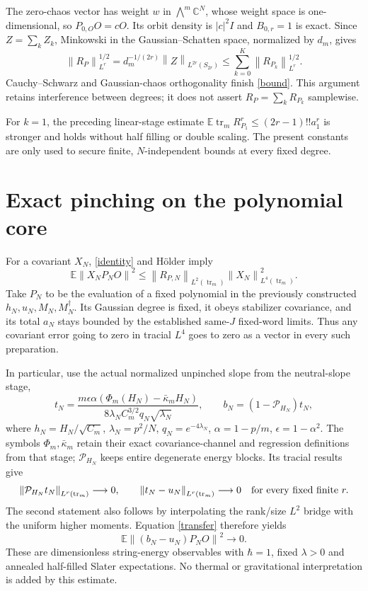 \documentclass[11pt]{article}
\newcommand{\E}{\mathbb E}
\newcommand{\tr}{\operatorname{tr}}
\newcommand{\norm}[1]{\left\lVert#1\right\rVert}
\begin{document}
The zero-chaos vector has weight $w$ in $\bigwedge^m\mathbb C^N$,
whose weight space is one-dimensional, so $P_{0,O}O=cO$. Its orbit
density is $|c|^2I$ and $B_{0,r}=1$ is exact. Since $Z=\sum_kZ_k$,
Minkowski in the Gaussian--Schatten space, normalized by $d_m$, gives
\begin{equation}
 \norm{R_P}_{L^r}^{1/2}
 =d_m^{-1/(2r)}\norm{Z}_{L^{2r}(S_{2r})}
 \le\sum_{k=0}^K\norm{R_{P_k}}_{L^r}^{1/2}.
\end{equation}
Cauchy--Schwarz and Gaussian-chaos orthogonality finish
\eqref{bound}. This argument retains interference between degrees;
it does not assert $R_P=\sum_k R_{P_k}$ samplewise.

For $k=1$, the preceding linear-stage estimate
$\E\tr_m R_{P_1}^r\le(2r-1)!!a_1^r$ is stronger and holds without
half filling or double scaling. The present constants are only used
to secure finite, $N$-independent bounds at every fixed degree.

\newpage
\section{Exact pinching on the polynomial core}
For a covariant $X_N$, \eqref{identity} and H\"older imply
\begin{equation}\label{transfer}
 \E\norm{X_NP_NO}^2
 \le\norm{R_{P,N}}_{L^2(\tr_m)}\norm{X_N}_{L^4(\tr_m)}^2.
\end{equation}
Take $P_N$ to be the evaluation of a fixed polynomial in the previously
constructed $h_N,u_N,M_N,M_N^\dagger$. Its Gaussian
degree is fixed, it obeys stabilizer covariance, and its total
$a_N$ stays bounded by the established same-$J$ fixed-word limits.
Thus any covariant error going to zero in tracial $L^4$ goes to zero
as a vector in every such preparation.

In particular, use the actual normalized unpinched slope from the
neutral-slope stage,
\begin{equation}
 t_N=\frac{m\epsilon\alpha(\Phi_m(H_N)-\bar\kappa_mH_N)}
 {8\lambda_N C_m^{3/2}q_N\sqrt{\lambda_N}},\qquad
 b_N=(1-\mathcal P_{H_N})t_N,
\end{equation}
where $h_N=H_N/\sqrt{C_m}$, $\lambda_N=p^2/N$,
$q_N=e^{-4\lambda_N}$, $\alpha=1-p/m$, $\epsilon=1-\alpha^2$.
The symbols $\Phi_m,\bar\kappa_m$ retain their exact covariance-channel
and regression definitions from that stage; $\mathcal P_{H_N}$ keeps
entire degenerate energy blocks. Its tracial results give
\begin{equation}
 \norm{\mathcal P_{H_N}t_N}_{L^r(\tr_m)}\longrightarrow0,
 \qquad \norm{t_N-u_N}_{L^r(\tr_m)}\longrightarrow0
 \quad\hbox{for every fixed finite }r.
\end{equation}
The second statement also follows by interpolating the rank/size $L^2$
bridge with the uniform higher moments. Equation \eqref{transfer}
therefore yields
\begin{equation}\label{core}
 \E\norm{(b_N-u_N)P_NO}^2\longrightarrow0.
\end{equation}
These are dimensionless string-energy observables with $\hbar=1$,
fixed $\lambda>0$ and annealed half-filled Slater expectations. No
thermal or gravitational interpretation is added by this estimate.
\end{document}

